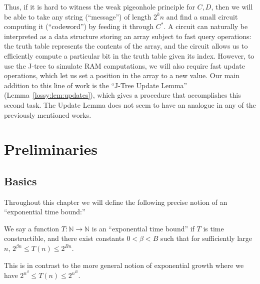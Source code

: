 Thus, if it is hard to witness the weak pigeonhole principle for $C,D$, then we will be able to take any string (``message'') of length $2^kn$ and find a small circuit computing it (``codeword'') by feeding it through $C^*$. A circuit can naturally be interpreted as a data structure storing an array subject to fast query operations: the truth table represents the contents of the array, and the circuit allows us to efficiently compute a particular bit in the truth table given its index. However, to use the J-tree to simulate RAM computations, we will also require fast update operations, which let  us set a position in the array to a new value. Our main addition to this line of work is the ``J-Tree Update Lemma'' (Lemma~\ref{lossy:lem:updates}), which gives a procedure that accomplishes this second task. The Update Lemma does not seem to have an analogue in any of the previously mentioned works.

\section{Preliminaries}\label{lossy:sec:prelim}
\subsection{Basics}\label{lossy:subsec:basics}
Throughout this chapter we will define the following precise notion of an ``exponential time bound:''
\begin{definition}
We say a function $T\colon \mathbb{N} \rightarrow \mathbb{N}$ is an ``exponential time bound'' if $T$ is time constructible, and there exist constants $0< \beta < B$ such that for sufficiently large $n$, $2^{\beta n} \leq T(n) \leq 2^{Bn}$.
\end{definition}
This is in contrast to the more general notion of exponential growth where we have $2^{n^\beta} \leq T(n) \leq 2^{n^B}$. 

